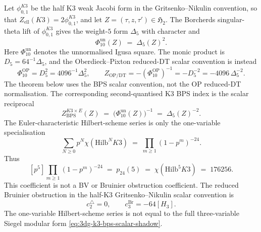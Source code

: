 \begin{theorem}
\label{thm:3dg-borcherds-ensemble-bridge}
Let $\phi_{0,1}^{K3}$ be the half K3 weak Jacobi form in the
Gritsenko--Nikulin convention, so that
\(Z_{\mathrm{ell}}(K3)=2\phi_{0,1}^{K3}\), and let
$Z=(\tau,z,\tau')\in\mathfrak H_2$. The Borcherds singular-theta lift
of $\phi_{0,1}^{K3}$ gives the weight-$5$ form $\Delta_5$ with
character and
\begin{equation}
\label{eq:3dg-phi10-borcherds-product}
\Phi_{10}^{\mathrm{un}}(Z)
\;=\;
\Delta_5(Z)^2.
\end{equation}
Here \(\Phi_{10}^{\mathrm{un}}\) denotes the unnormalised Igusa square.
The monic product is \(D_5=64^{-1}\Delta_5\), and the
Oberdieck--Pixton reduced-DT scalar convention is instead
\[
 \Phi_{10}^{\mathrm{OP}}=D_5^2=4096^{-1}\Delta_5^2,\qquad
 Z_{\mathrm{OP/DT}}=-(\Phi_{10}^{\mathrm{OP}})^{-1}
 =-D_5^{-2}=-4096\,\Delta_5^{-2}.
\]
The theorem below uses the BPS scalar convention, not the OP reduced-DT
normalisation.
The corresponding second-quantised K3 BPS index is the scalar
reciprocal
\begin{equation}
\label{eq:3dg-k3-bps-scalar-shadow}
Z^{K3\times E}_{\mathrm{BPS}}(Z)
\;=\;
\bigl(\Phi_{10}^{\mathrm{un}}(Z)\bigr)^{-1}
\;=\;
\Delta_5(Z)^{-2}.
\end{equation}
The Euler-characteristic Hilbert-scheme series is only the
one-variable specialisation
\begin{equation}
\label{eq:3dg-gottsche-specialization}
\sum_{N\ge 0} p^N\chi(\mathrm{Hilb}^N K3)
\;=\;
\prod_{m\ge 1}(1-p^m)^{-24}.
\end{equation}
Thus
\[
 [p^5]\prod_{m\ge 1}(1-p^m)^{-24}
 \;=\;
 p_{24}(5)
 \;=\;
 \chi(\mathrm{Hilb}^5 K3)
 \;=\;
 176256.
\]
This coefficient is not a BV or Bruinier obstruction coefficient.
The reduced Bruinier obstruction in the half-K3
Gritsenko--Nikulin scalar convention is
\[
 c_2^{\triangle}=0,\qquad
 c_3^{\mathrm{Br}}=-64[H_3].
\]
The one-variable Hilbert-scheme series is not equal to the full
three-variable Siegel modular form
\eqref{eq:3dg-k3-bps-scalar-shadow}.
\end{theorem}

